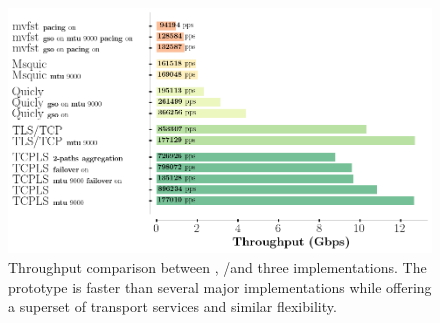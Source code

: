 \begin{figure}[!t]
  \begin{center}
    \includegraphics[width=\columnwidth]{figures/perf_analysis.png}
  \end{center}
  \caption{Throughput comparison between \tcpls, \tcp/\tls and three \quic 
  implementations.
    The
    \tcpls prototype is faster than several major \quic implementations while
    offering a superset of transport services and similar flexibility.}
  \label{fig:perf}
\end{figure}




